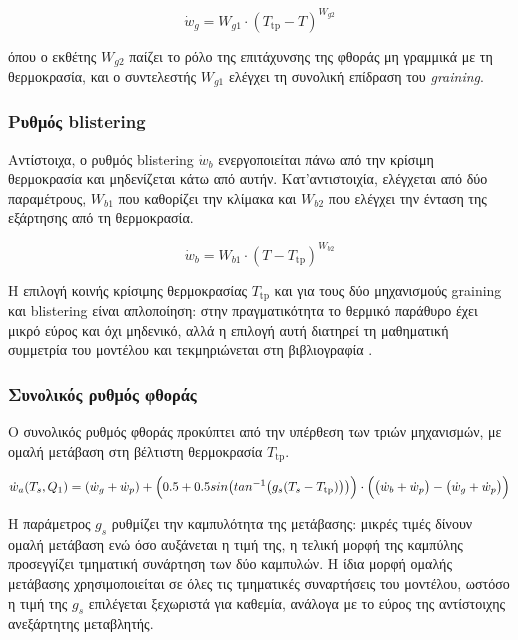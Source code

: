 \begin{equation}
    \dot{w}_g = W_{g1} \cdot (T_{\mathrm{tp}} - T)^{W_{g2}}
    \label{eq:w_g}
\end{equation}

όπου ο εκθέτης $W_{g2}$ παίζει το ρόλο της επιτάχυνσης της φθοράς μη γραμμικά με τη θερμοκρασία, και ο συντελεστής $W_{g1}$ ελέγχει τη συνολική επίδραση του 
\textit{graining}.

\subsubsection{Ρυθμός blistering}

Αντίστοιχα, ο ρυθμός blistering $\dot{w}_b$ ενεργοποιείται πάνω από την κρίσιμη θερμοκρασία και
μηδενίζεται κάτω από αυτήν. Κατ'αντιστοιχία, ελέγχεται από δύο παραμέτρους, $W_{b1}$ που
καθορίζει την κλίμακα και $W_{b2}$ που ελέγχει την ένταση της εξάρτησης από τη θερμοκρασία.

\begin{equation}
    \dot{w}_b = W_{b1} \cdot (T - T_{\mathrm{tp}})^{W_{b2}}
    \label{eq:Wb}
\end{equation}

Η επιλογή κοινής κρίσιμης θερμοκρασίας $T_{\mathrm{tp}}$ και για τους δύο μηχανισμούς
graining και blistering είναι απλοποίηση: στην πραγματικότητα το θερμικό παράθυρο έχει
μικρό εύρος και όχι μηδενικό, αλλά η επιλογή αυτή διατηρεί τη μαθηματική συμμετρία του
μοντέλου και τεκμηριώνεται στη βιβλιογραφία \cite{West2022,Tremlett2016}.

\subsubsection{Συνολικός ρυθμός φθοράς}

Ο συνολικός ρυθμός φθοράς προκύπτει από την υπέρθεση των τριών μηχανισμών, με ομαλή
μετάβαση στη βέλτιστη θερμοκρασία $T_{\mathrm{tp}}$.

\begin{equation}
\dot{w}_a(T_s,Q_1) = (\dot{w}_g+\dot{w}_p) + \Bigl(0.5+0.5sin\bigl(tan^{-1}\bigl(g_s(T_s-T_{\mathrm{tp}})\bigr)\bigr)\Bigr)
\cdot \Bigl(\bigl(\dot{w}_b +\dot{w}_p \bigr) -
\bigl(\dot{w}_g +\dot{w}_p \bigr) \Bigr)
    \label{eq:Wtotal}
\end{equation}

Η παράμετρος $g_s$ ρυθμίζει την καμπυλότητα της μετάβασης:
μικρές τιμές δίνουν ομαλή μετάβαση ενώ όσο αυξάνεται η τιμή της, η τελική μορφή της καμπύλης προσεγγίζει τμηματική συνάρτηση των δύο καμπυλών.
Η ίδια μορφή ομαλής μετάβασης χρησιμοποιείται σε όλες τις τμηματικές συναρτήσεις του μοντέλου, ωστόσο η τιμή της $g_s$ επιλέγεται ξεχωριστά για καθεμία, ανάλογα με το εύρος της αντίστοιχης ανεξάρτητης μεταβλητής.

